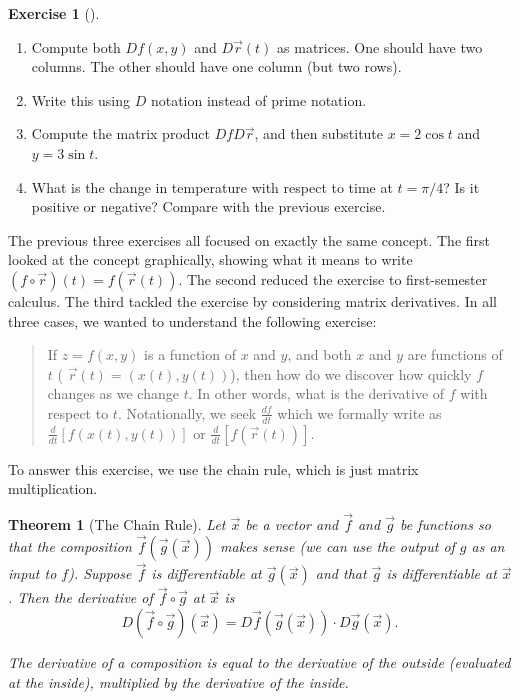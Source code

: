 \documentclass[10pt,]{book}
\theoremstyle{plain}
\newtheorem{theorem}{Theorem}[section]
\theoremstyle{definition}
\theoremstyle{definition}
\theoremstyle{definition}
\theoremstyle{definition}
\newtheorem{exploration}[project]{Exercise}
\theoremstyle{definition}
\numberwithin{equation}{section}
\newcommand{\ds}{\displaystyle}
\begin{document}
\begin{exploration}[]\label{exploration-152}
\leavevmode%
\begin{enumerate}[font=\bfseries,label=(\alph*),ref=\alph*]
\item\label{task-353} Compute both \(Df(x,y)\) and \(D\vec r(t)\) as matrices. One should have two columns.  The other should have one column (but two rows).%
\item\label{task-354} Write this using \(D\) notation instead of prime notation.%
\item\label{task-355} Compute the matrix product \(DfD\vec r\), and then substitute \(x=2\cos t\) and \(y=3\sin t\).%
\item\label{task-356} What is the change in temperature with respect to time at \(t=\pi/4\)? Is it positive or negative? Compare with the previous exercise.%
\end{enumerate}
\end{exploration}
The previous three exercises all focused on exactly the same concept. The first looked at the concept graphically, showing what it means to write \((f\circ \vec r)(t)=f(\vec r(t))\). The second reduced the exercise to first-semester calculus. The third tackled the exercise by considering matrix derivatives. In all three cases, we wanted to understand the following exercise:%
\begin{quote}\hypertarget{blockquote-3}{}
If \(z=f(x,y)\) is a function of \(x\) and \(y\), and both \(x\) and \(y\) are functions of \(t\) ( \(\vec r(t)=(x(t),y(t))\)), then how do we discover how quickly \(f\) changes as we change \(t\). In other words, what is the derivative of \(f\) with respect to \(t\). Notationally, we seek \(\ds \frac{df}{dt}\) which we formally write as \(\ds \frac{d}{dt}[f(x(t),y(t))]\) or \(\ds \frac{d}{dt} [f(\vec r(t))].\)\end{quote}
To answer this exercise, we use the chain rule, which is just matrix multiplication.%
\begin{theorem}[{The Chain Rule}]\label{def_chain_rule}
Let \(\vec x\) be a vector and \(\vec f\) and \(\vec g\) be functions so that the composition \(\vec f(\vec g(\vec x))\) makes sense (we can use the output of \(g\) as an input to \(f\)). Suppose \(\vec f\) is differentiable at \(\vec g(\vec x)\) and that \(\vec g\) is differentiable at \(\vec x\). Then the derivative of \(\vec f\circ \vec g\) at \(\vec x\) is%
\begin{equation*}
D(\vec f\circ \vec g)(\vec x) = D\vec f(\vec g(\vec x))\cdot D\vec g(\vec x).
\end{equation*}
%
\par
The derivative of a composition is equal to the derivative of the outside (evaluated at the inside), multiplied by the derivative of the inside.%
\end{theorem}
\end{document}
